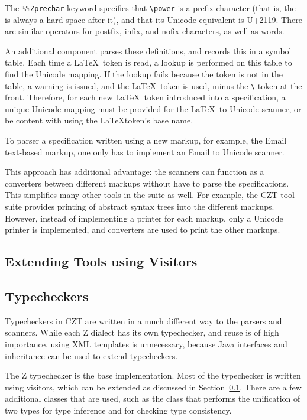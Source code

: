 \documentclass{llncs}
\begin{document}
The {\tt \%\%Zprechar} keyword specifies that \verb+\power+ is a
prefix character (that is, the is always a hard space after it), and
that its Unicode equivalent is U+2119. There are similar operators for
postfix, infix, and nofix characters, as well as words.

An additional component parses these definitions, and records this in
a symbol table. Each time a \LaTeX~token is read, a lookup is
performed on this table to find the Unicode mapping. If the lookup
fails because the token is not in the table, a warning is issued, and
the \LaTeX~token is used, minus the \verb+\+ token at the
front. Therefore, for each new \LaTeX~token introduced into a
specification, a unique Unicode mapping must be provided for the
\LaTeX~to Unicode scanner, or be content with using the \LaTeX token's
base name.

To parser a specification written using a new markup, for example, the
Email text-based markup, one only has to implement an Email to Unicode
scanner.

This approach has additional advantage: the scanners can function as a
converters between different markups without have to parse the
specifications. This simplifies many other tools in the suite as
well. For example, the CZT tool suite provides printing of abstract
syntax trees into the different markups. However, instead of
implementing a printer for each markup, only a Unicode printer is
implemented, and converters are used to print the other markups.

\subsection{Extending Tools using Visitors}
\label{extending-visitors}

\subsection{Typecheckers}

Typecheckers in CZT are written in a much different way to the parsers
and scanners. While each Z dialect has its own typechecker, and reuse
is of high importance, using XML templates is unnecessary, because
Java interfaces and inheritance can be used to extend typecheckers.

The Z typechecker is the base implementation. Most of the typechecker
is written using visitors, which can be extended as discussed in
Section~\ref{extending-visitors}. There are a few additional classes
that are used, such as the class that performs the unification of two
types for type inference and for checking type consistency.
\end{document}
